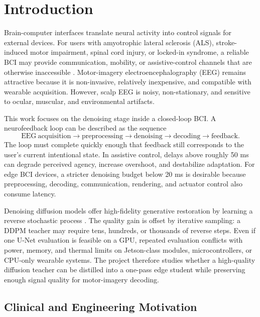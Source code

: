 \documentclass[11pt]{article}
\begin{document}
\tableofcontents
\listoffigures
\listoftables
\newpage
{}

\section{Introduction}

Brain-computer interfaces translate neural activity into control signals for external devices. For users with amyotrophic lateral sclerosis (ALS), stroke-induced motor impairment, spinal cord injury, or locked-in syndrome, a reliable BCI may provide communication, mobility, or assistive-control channels that are otherwise inaccessible \cite{wolpaw2002bci, pfurtscheller2001motor}. Motor-imagery electroencephalography (EEG) remains attractive because it is non-invasive, relatively inexpensive, and compatible with wearable acquisition. However, scalp EEG is noisy, non-stationary, and sensitive to ocular, muscular, and environmental artifacts.

This work focuses on the denoising stage inside a closed-loop BCI. A neurofeedback loop can be described as the sequence
\[
\mathrm{EEG\ acquisition} \rightarrow \mathrm{preprocessing} \rightarrow \mathrm{denoising} \rightarrow \mathrm{decoding} \rightarrow \mathrm{feedback}.
\]
The loop must complete quickly enough that feedback still corresponds to the user's current intentional state. In assistive control, delays above roughly 50 ms can degrade perceived agency, increase overshoot, and destabilize adaptation. For edge BCI devices, a stricter denoising budget below 20 ms is desirable because preprocessing, decoding, communication, rendering, and actuator control also consume latency.

Denoising diffusion models offer high-fidelity generative restoration by learning a reverse stochastic process \cite{ho2020ddpm}. The quality gain is offset by iterative sampling: a DDPM teacher may require tens, hundreds, or thousands of reverse steps. Even if one U-Net evaluation is feasible on a GPU, repeated evaluation conflicts with power, memory, and thermal limits on Jetson-class modules, microcontrollers, or CPU-only wearable systems. The project therefore studies whether a high-quality diffusion teacher can be distilled into a one-pass edge student while preserving enough signal quality for motor-imagery decoding.

\subsection{Clinical and Engineering Motivation}
\end{document}
